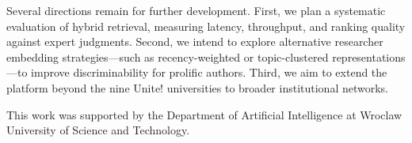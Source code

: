 \documentclass[sigconf, nonacm]{acmart}
\begin{document}
Several directions remain for further development. First, we plan a systematic evaluation of hybrid retrieval, measuring latency, throughput, and ranking quality against expert judgments. Second, we intend to explore alternative researcher embedding strategies---such as recency-weighted or topic-clustered representations---to improve discriminability for prolific authors. Third, we aim to extend the platform beyond the nine Unite! universities to broader institutional networks.

\begin{acks}
This work was supported by the Department of Artificial Intelligence at Wroclaw University of Science and Technology.
\end{acks}



\end{document}
